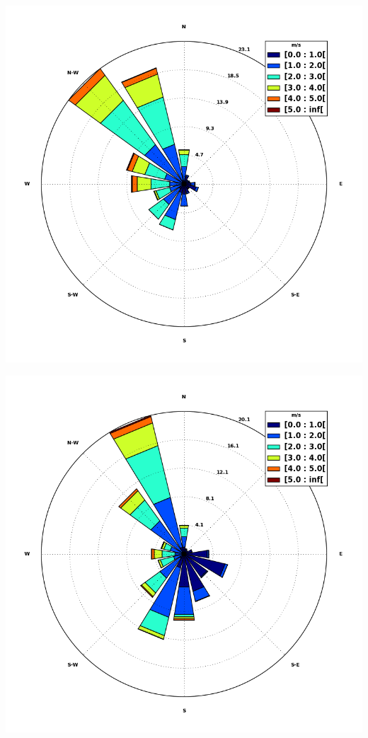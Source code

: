 \documentclass[a0, landscape]{a0poster}
\begin{document}
\begin{multicols}{3}
\begin{minipage}{.08\textwidth}
	\begin{center}			
		\includegraphics[width=\linewidth]{windrose_Remote}
	\end{center}
\end{minipage}
\hfill
\begin{minipage}{.08\textwidth}
	\begin{center}			
		\includegraphics[width=\linewidth]{windrose_None}
	\end{center}
\end{minipage}

\end{multicols}

\vspace{20 pt}

\small

\printbibliography[heading=none]
\end{document}
